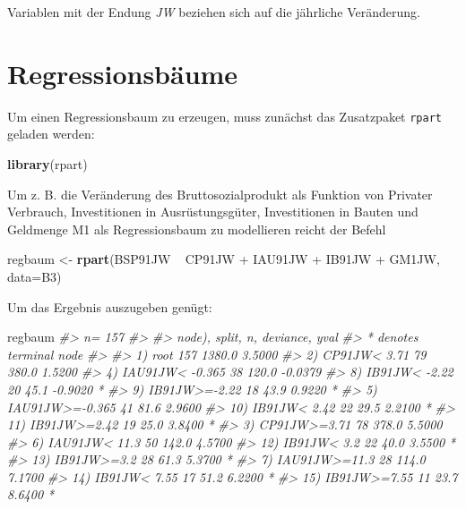 \documentclass[12pt,]{book}
\newenvironment{Shaded}{\begin{snugshade}}{\end{snugshade}}
\newcommand{\KeywordTok}[1]{\textcolor[rgb]{0.13,0.29,0.53}{\textbf{{#1}}}}
\newcommand{\DataTypeTok}[1]{\textcolor[rgb]{0.13,0.29,0.53}{{#1}}}
\newcommand{\StringTok}[1]{\textcolor[rgb]{0.31,0.60,0.02}{{#1}}}
\newcommand{\CommentTok}[1]{\textcolor[rgb]{0.56,0.35,0.01}{\textit{{#1}}}}
\newcommand{\NormalTok}[1]{{#1}}
\begin{document}
Variablen mit der Endung \emph{JW} beziehen sich auf die jährliche
Veränderung.

\section{Regressionsbäume}\label{regressionsbaume}

Um einen Regressionsbaum zu erzeugen, muss zunächst das Zusatzpaket
\texttt{rpart} geladen werden:

\begin{Shaded}
\begin{Highlighting}[]
\KeywordTok{library}\NormalTok{(rpart)}
\end{Highlighting}
\end{Shaded}

Um z. B. die Veränderung des Bruttosozialprodukt als Funktion von
Privater Verbrauch, Investitionen in Ausrüstungsgüter, Investitionen in
Bauten und Geldmenge M1 als Regressionsbaum zu modellieren reicht der
Befehl

\begin{Shaded}
\begin{Highlighting}[]
\NormalTok{regbaum <-}\StringTok{ }\KeywordTok{rpart}\NormalTok{(BSP91JW ~}\StringTok{ }\NormalTok{CP91JW +}\StringTok{ }\NormalTok{IAU91JW +}\StringTok{ }\NormalTok{IB91JW +}\StringTok{ }\NormalTok{GM1JW, }\DataTypeTok{data=}\NormalTok{B3)}
\end{Highlighting}
\end{Shaded}

Um das Ergebnis auszugeben genügt:

\begin{Shaded}
\begin{Highlighting}[]
\NormalTok{regbaum}
\CommentTok{#> n= 157 }
\CommentTok{#> }
\CommentTok{#> node), split, n, deviance, yval}
\CommentTok{#>       * denotes terminal node}
\CommentTok{#> }
\CommentTok{#>  1) root 157 1380.0  3.5000  }
\CommentTok{#>    2) CP91JW< 3.71 79  380.0  1.5200  }
\CommentTok{#>      4) IAU91JW< -0.365 38  120.0 -0.0379  }
\CommentTok{#>        8) IB91JW< -2.22 20   45.1 -0.9020 *}
\CommentTok{#>        9) IB91JW>=-2.22 18   43.9  0.9220 *}
\CommentTok{#>      5) IAU91JW>=-0.365 41   81.6  2.9600  }
\CommentTok{#>       10) IB91JW< 2.42 22   29.5  2.2100 *}
\CommentTok{#>       11) IB91JW>=2.42 19   25.0  3.8400 *}
\CommentTok{#>    3) CP91JW>=3.71 78  378.0  5.5000  }
\CommentTok{#>      6) IAU91JW< 11.3 50  142.0  4.5700  }
\CommentTok{#>       12) IB91JW< 3.2 22   40.0  3.5500 *}
\CommentTok{#>       13) IB91JW>=3.2 28   61.3  5.3700 *}
\CommentTok{#>      7) IAU91JW>=11.3 28  114.0  7.1700  }
\CommentTok{#>       14) IB91JW< 7.55 17   51.2  6.2200 *}
\CommentTok{#>       15) IB91JW>=7.55 11   23.7  8.6400 *}
\end{Highlighting}
\end{Shaded}
\end{document}

